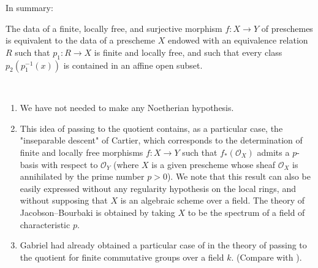 In summary:

\begin{aside}\label{fga3.iii-5-scholium}
    The data of a finite, locally free, and surjective morphism $f\colon X\to Y$ of preschemes is equivalent to the data of a prescheme $X$ endowed with an equivalence relation $R$ such that $p_1\colon R\to X$ is finite and locally free, and such that every class $p_2(p_1^{-1}(x))$ is contained in an affine open subset.
\end{aside}

\begin{remark}\label{fga3.iii-5-remarks-5.6}
    ~
    \begin{enumerate}
        \item We have not needed to make any Noetherian hypothesis.
        \item This idea of passing to the quotient contains, as a particular case, the "inseparable descent" of Cartier, which corresponds to the determination of finite and locally free morphisms $f\colon X\to Y$ such that $f_*(\mathcal{O}_X)$ admits a $p$-basis with respect to $\mathcal{O}_Y$ (where $X$ is a given prescheme whose sheaf $\mathcal{O}_X$ is annihilated by the prime number $p>0$).
              We note that this result can also be easily expressed without any regularity hypothesis on the local rings, and without supposing that $X$ is an algebraic scheme over a field.
              The theory of Jacobson–Bourbaki is obtained by taking $X$ to be the spectrum of a field of characteristic $p$.
        \item Gabriel had already obtained a particular case of  in the theory of passing to the quotient for finite commutative groups over a field $k$.
              (Compare with ).
    \end{enumerate}
\end{remark}